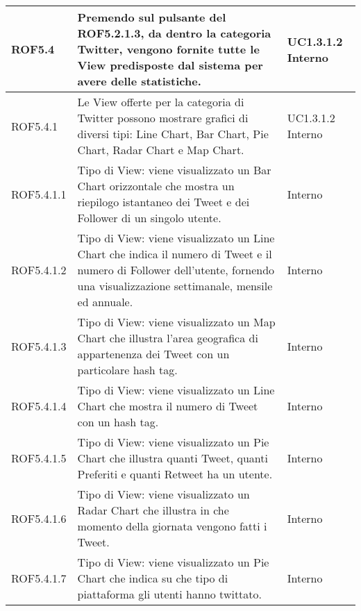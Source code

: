 \begin{center}
\begin{longtable}{| p{2.5cm} | p{8cm} | p{2cm} |}
		ROF5.4  &  Premendo sul pulsante del ROF5.2.1.3, da dentro la categoria Twitter, vengono fornite tutte le View predisposte dal sistema per avere delle statistiche. &  UC1.3.1.2 \newline Interno \\
		\hline
		ROF5.4.1  & Le View offerte per la categoria di Twitter possono mostrare grafici di diversi tipi: Line Chart, Bar Chart, Pie Chart, Radar Chart e Map Chart.  &  UC1.3.1.2 \newline Interno \\
		\hline
		ROF5.4.1.1  &  Tipo di View: viene visualizzato un Bar Chart orizzontale che mostra un riepilogo istantaneo dei Tweet e dei Follower di un singolo utente. & Interno \\
		\hline
		ROF5.4.1.2  &  Tipo di View: viene visualizzato un Line Chart che indica il numero di Tweet e il numero di Follower dell'utente, fornendo una visualizzazione settimanale, mensile ed annuale. & Interno \\
		\hline
		ROF5.4.1.3  &  Tipo di View: viene visualizzato un Map Chart che illustra l'area geografica di appartenenza dei Tweet con un particolare hash tag. & Interno \\
		\hline
		ROF5.4.1.4  &  Tipo di View: viene visualizzato un Line Chart che mostra il numero di Tweet con un hash tag.  & Interno \\
		\hline
		ROF5.4.1.5  &  Tipo di View: viene visualizzato un Pie Chart che illustra quanti Tweet, quanti Preferiti e quanti Retweet ha un utente. & Interno \\
		\hline
		ROF5.4.1.6  &  Tipo di View: viene visualizzato un Radar Chart che illustra in che momento della giornata vengono fatti i Tweet. & Interno \\
		\hline
		ROF5.4.1.7  &  Tipo di View: viene visualizzato un Pie Chart che indica su che tipo di piattaforma gli utenti hanno twittato. & Interno \\
		\hline



\end{longtable}
\end{center}
